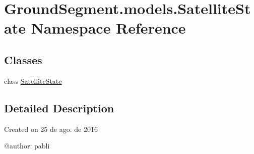 \hypertarget{namespace_ground_segment_1_1models_1_1_satellite_state}{}\section{Ground\+Segment.\+models.\+Satellite\+State Namespace Reference}
\label{namespace_ground_segment_1_1models_1_1_satellite_state}
\subsection*{Classes}
\begin{DoxyCompactItemize}
\item 
class \hyperlink{class_ground_segment_1_1models_1_1_satellite_state_1_1_satellite_state}{Satellite\+State}
\end{DoxyCompactItemize}


\subsection{Detailed Description}
\begin{DoxyVerb}Created on 25 de ago. de 2016

@author: pabli
\end{DoxyVerb}
 